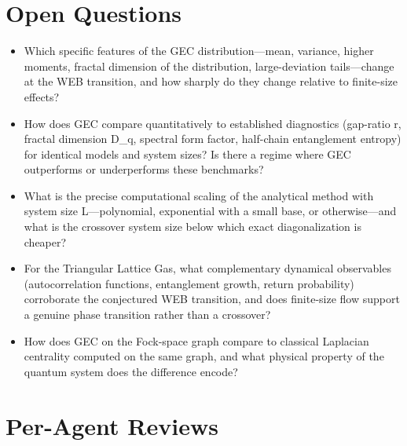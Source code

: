 \documentclass[11pt]{article}
\begin{document}
\section*{Open Questions}
\begin{itemize}[leftmargin=*]
  \item Which specific features of the GEC distribution—mean, variance, higher moments, fractal dimension of the distribution, large-deviation tails—change at the WEB transition, and how sharply do they change relative to finite-size effects?
  \item How does GEC compare quantitatively to established diagnostics (gap-ratio r, fractal dimension D\_q, spectral form factor, half-chain entanglement entropy) for identical models and system sizes? Is there a regime where GEC outperforms or underperforms these benchmarks?
  \item What is the precise computational scaling of the analytical method with system size L—polynomial, exponential with a small base, or otherwise—and what is the crossover system size below which exact diagonalization is cheaper?
  \item For the Triangular Lattice Gas, what complementary dynamical observables (autocorrelation functions, entanglement growth, return probability) corroborate the conjectured WEB transition, and does finite-size flow support a genuine phase transition rather than a crossover?
  \item How does GEC on the Fock-space graph compare to classical Laplacian centrality computed on the same graph, and what physical property of the quantum system does the difference encode?
\end{itemize}

\section*{Per-Agent Reviews}
\end{document}
